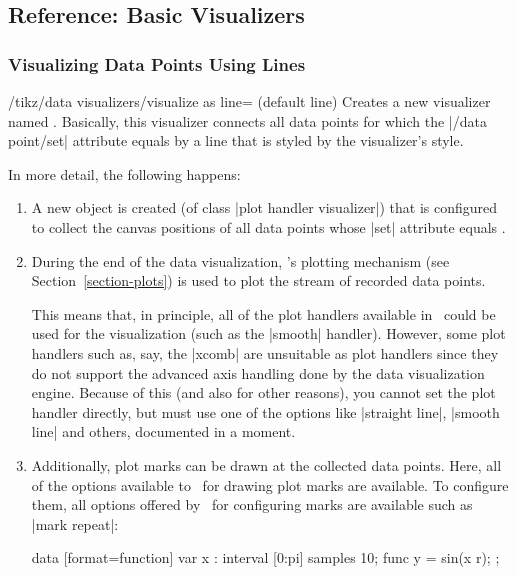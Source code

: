 \subsection{Reference: Basic Visualizers}

\subsubsection{Visualizing Data Points Using Lines}

\begin{key}{/tikz/data visualizers/visualize as line= (default line)}
  Creates a new visualizer named . Basically, 
  this visualizer connects all data points for which the
  |/data point/set| attribute equals  by
  a line that is styled by the visualizer's style.

  In more detail, the following happens:
  \begin{enumerate}
  \item A new object is created (of class |plot handler visualizer|)
    that is configured to collect the canvas positions of all data
    points whose |set| attribute equals .
  \item During the end of the data visualization, \pgfname's plotting
    mechanism (see Section~\ref{section-plots}) is used to plot the
    stream of recorded data points.

    This means that, in principle, all of the plot handlers available
    in \tikzname\ could be used for the visualization (such as the
    |smooth| handler). However, some plot handlers such as, say, the
    |xcomb| are unsuitable as plot handlers since they do not support
    the advanced axis handling done by the data visualization
    engine. Because of this (and also for other reasons), you cannot
    set the plot handler directly, but must use one of the options
    like |straight line|, |smooth line| and others, documented in a
    moment.
  \item Additionally, plot marks can be drawn at the collected data
    points. Here, all of the options available to \tikzname\ for
    drawing plot marks are available. To configure them, all options
    offered by \tikzname\ for  configuring marks are available such as
    |mark repeat|:  
\begin{codeexample}[width=7cm]
\tikz \datavisualization
 [scientific axes=clean, 
  visualize as line=my data,
  my data={style={mark=x, mark repeat=3}}]
data [format=function] {
  var x : interval [0:pi] samples 10;
  func y = sin(\value x r);
};
\end{codeexample}
  \end{enumerate}
  

\end{key}
